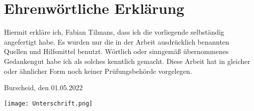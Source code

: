 \section*{Ehrenwörtliche Erklärung}

Hiermit erkläre ich, Fabian Tilmans, dass ich die vorliegende \documentType{} selbständig angefertigt habe. 
Es wurden nur die in der Arbeit ausdrücklich benannten Quellen und Hilfsmittel benutzt. 
Wörtlich oder sinngemäß übernommenes Gedankengut habe ich als solches kenntlich gemacht. 
Diese Arbeit hat in gleicher oder ähnlicher Form noch keiner Prüfungsbehörde vorgelegen.
\vspace{20mm}

Burscheid, den 01.05.2022
\vspace{10mm}

\hspace*{-0.5cm}\texttt{[image: Unterschrift.png]}
\hspace{8cm}\\\documentAuthor{}